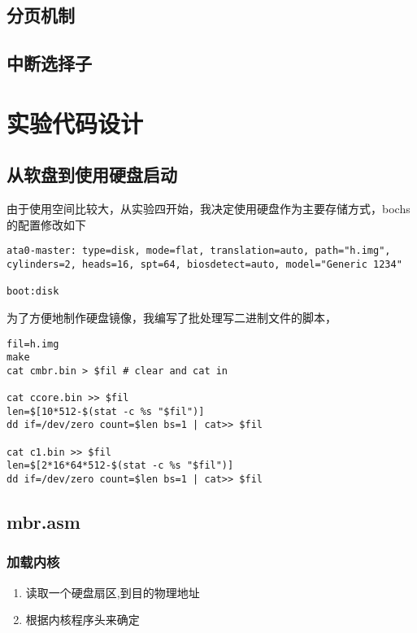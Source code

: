 \documentclass[a4paper,11pt,UTF8]{ctexart}
\begin{document}
	\subsection{分页机制}
	\subsection{中断选择子}

	
	

\section{实验代码设计}
	\subsection{从软盘到使用硬盘启动}
	由于使用空间比较大，从实验四开始，我决定使用硬盘作为主要存储方式，bochs的配置修改如下
	\begin{lstlisting}[caption={bochs硬盘配置参数},tabsize=4,basicstyle=\footnotesize,captionpos=b]
ata0-master: type=disk, mode=flat, translation=auto, path="h.img", cylinders=2, heads=16, spt=64, biosdetect=auto, model="Generic 1234"

boot:disk	
	\end{lstlisting}

	为了方便地制作硬盘镜像，我编写了批处理写二进制文件的脚本，
	\begin{lstlisting}[caption={make diskimg.sh},tabsize=4,basicstyle=\footnotesize,captionpos=b]
fil=h.img
make
cat cmbr.bin > $fil # clear and cat in

cat ccore.bin >> $fil
len=$[10*512-$(stat -c %s "$fil")]
dd if=/dev/zero count=$len bs=1 | cat>> $fil

cat c1.bin >> $fil
len=$[2*16*64*512-$(stat -c %s "$fil")]
dd if=/dev/zero count=$len bs=1 | cat>> $fil
	\end{lstlisting}

	\subsection{mbr.asm}
		\subsubsection{加载内核}
			\begin{enumerate}
				\item 读取一个硬盘扇区,到目的物理地址
				\item 根据内核程序头来确定
			\end{enumerate}
\end{document}
